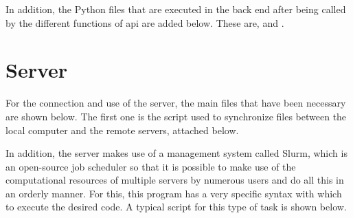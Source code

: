 In addition, the Python files that are executed in the back end after being
called by the different functions of \gls{api} are added below. These are,
 and .





\section{Server}\label{sec:code-server}

For the connection and use of the server, the main files that have been
necessary are shown below. The first one is the script used to synchronize
files between the local computer and the remote servers, attached below.


In addition, the server makes use of a management system called Slurm, which is
an open-source job scheduler so that it is possible to make use of the
computational resources of multiple servers by numerous users and do all this
in an orderly manner. For this, this program has a very specific syntax with
which to execute the desired code. A typical script for this type of task is
shown below.

